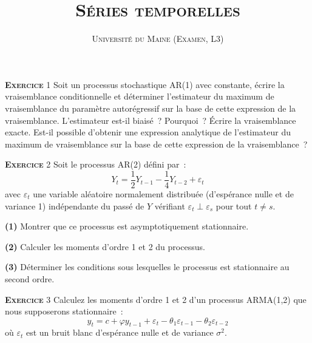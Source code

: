 \documentclass[10pt,a4paper,notitlepage,onecolumn]{article}
\newcommand{\exercice}[1]{\textsc{\textbf{Exercice}} #1}
\newcommand{\question}[1]{\textbf{(#1)}}
\begin{document}
\title{\textsc{Séries temporelles}}
\author{\textsc{Université du Maine (Examen, L3)}}
\date{}


\maketitle

\thispagestyle{empty}

\exercice{1} Soit un processus stochastique AR(1) avec constante,
écrire la vraisemblance conditionnelle et déterminer l'estimateur du
maximum de vraisemblance du paramètre autorégressif sur la base de
cette expression de la vraisemblance. L'estimateur est-il biaisé~?
Pourquoi~? Écrire la vraisemblance exacte. Est-il possible d'obtenir
une expression analytique de l'estimateur du maximum de vraisemblance
sur la base de cette expression de la vraisemblance~?



\bigskip\bigskip



\exercice{2} Soit le processus AR(2) défini par~:
\[
  Y_t = \frac{1}{2}Y_{t-1} - \frac{1}{4}Y_{t-2} + \varepsilon_t
\]
avec $\varepsilon_t$ une variable aléatoire normalement distribuée (d'espérance nulle et de variance 1) indépendante du passé de $Y$ vérifiant $\varepsilon_t \perp \varepsilon_s$ pour tout $t\neq s$.\newline

\question{1} Montrer que ce processus est asymptotiquement stationnaire.\newline

\question{2} Calculer les moments d'ordre 1 et 2 du processus.\newline

\question{3} Déterminer les conditions sous lesquelles le processus est stationnaire au second ordre.\newline



\bigskip\bigskip



\exercice{3} Calculez les moments d'ordre 1 et 2 d'un processus ARMA(1,2) que nous supposerons stationnaire~:
\[
y_t = c + \varphi y_{t-1} + \varepsilon_t - \theta_1 \varepsilon_{t-1} - \theta_2 \varepsilon_{t-2}
\]
où $\varepsilon_t$ est un bruit blanc d'espérance nulle et de variance $\sigma^2$.
\end{document}
